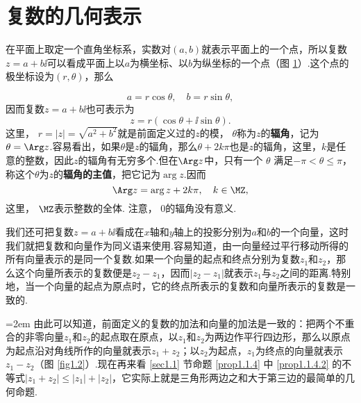 \section{复数的几何表示\label{sec1.2}}
在平面上取定一个直角坐标系，实数对$(a,b)$就表示平面上的一个点，所以复数$z=a+b\ii$可以看成平面上以$a$为横坐标、以$b$为纵坐标的一个点（图 \ref{fig1.1}）.这个点的极坐标设为$(r,\theta)$，那么
\begin{figure}[!ht]
\centering
{}
\caption{}\label{fig1.1}
\end{figure}
\[a=r\cos\theta,\quad b=r\sin\theta,\]
因而复数$z=a+b\ii$也可表示为
\[z=r(\cos\theta+\ii\sin\theta).\]
这里， $r=|z|=\sqrt{a^2+b^2}$就是前面定义过的$z$的模， $\theta$称为$z$的\textbf{辐角}，记为$\theta=\Arg z$.容易看出，如果$\theta$是$z$的辐角，那么$\theta+2k\pi$也是$z$的辐角，这里，$k$是任意的整数，因此$z$的辐角有无穷多个.但在$\Arg z$中，只有一个 $\theta$ 满足$-\pi<\theta\le\pi$，称这个$\theta$为$z$的\textbf{辐角的主值}，把它记为$\arg z$.因而
\[\Arg z=\arg z+2k\pi,\quad k\in\MZ,\]
这里， $\MZ$表示整数的全体. 注意， $0$的辐角没有意义.

我们还可把复数$z=a+b\ii$看成在$x$轴和$y$轴上的投影分别为$a$和$b$的一个向量，这时我们就把复数和向量作为同义语来使用.容易知道，由一向量经过平行移动所得的所有向量表示的是同一个复数.如果一个向量的起点和终点分别为复数$z_1$和$z_2$，那么这个向量所表示的复数便是$z_2-z_1$，因而$|z_2-z_1|$就表示$z_1$与$z_2$之间的距离.特别地，当一个向量的起点为原点时，它的终点所表示的复数和向量所表示的复数是一致的.

\noindent\begin{minipage}{0.4\textwidth}
\centering
{}
\end{minipage}
\begin{minipage}{0.6\textwidth}\parindent=2em
由此可以知道，前面定义的复数的加法和向量的加法是一致的：把两个不重合的非零向量$z_1$和$z_2$的起点取在原点，以$z_1$和$z_2$为两边作平行四边形，那么以原点为起点沿对角线所作的向量就表示$z_1+z_2$；以$z_2$为起点，$z_1$为终点的向量就表示$z_1-z_2$（图 \ref{fig1.2}）.现在再来看 \ref{sec1.1} 节命题 \ref{prop1.1.4} 中 \ref{prop1.1.4.2} 的不等式$|z_1+z_2|\le|z_1|+|z_2|$，它实际上就是三角形两边之和大于第三边的最简单的几何命题.
\end{minipage}

